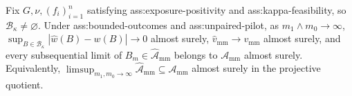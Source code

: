 Fix \(G,\nu,(f_i)_{i=1}^n\) satisfying ass:exposure-positivity and ass:kappa-feasibility, so \(\mathcal B_\kappa\neq\varnothing\). Under ass:bounded-outcomes and ass:unpaired-pilot, as \(m_1\wedge m_0\to\infty\), \(\sup_{B\in\mathcal B_\kappa}|\widehat w(B)-w(B)|\to0\) almost surely, \(\widehat v_{\mathrm{mm}}\to v_{\mathrm{mm}}\) almost surely, and every subsequential limit of \(B_m\in\widehat{\mathcal A}_{\mathrm{mm}}\) belongs to \(\mathcal A_{\mathrm{mm}}\) almost surely. Equivalently, \(\limsup_{m_1,m_0\to\infty}\widehat{\mathcal A}_{\mathrm{mm}}\subseteq\mathcal A_{\mathrm{mm}}\) almost surely in the projective quotient.